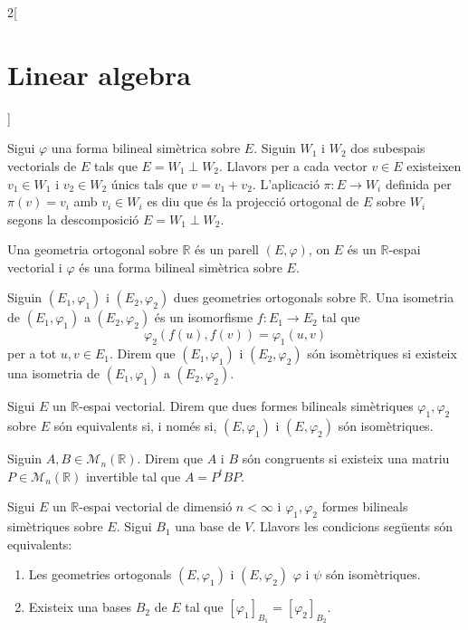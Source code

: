\documentclass[../../../main.tex]{subfiles}
\begin{document}
\begin{multicols}{2}[\section{Linear algebra}]
\begin{definition}
\end{definition}
\begin{definition}
Sigui $\varphi$ una forma bilineal simètrica sobre $E$. Siguin $W_1$ i $W_2$ dos subespais vectorials de $E$ tals que $E=W_1\perp W_2$. Llavors per a cada vector $v\in E$ existeixen $v_1\in W_1$ i $v_2\in W_2$ únics tals que $v=v_1+v_2$. L'aplicació $\pi:E\rightarrow W_i$ definida per $\pi(v)=v_i$ amb $v_i\in W_i$ es diu que és la projecció ortogonal de $E$ sobre $W_i$ segons la descomposició $E=W_1\perp W_2$.
\label{perpendicular}
\end{definition}
\begin{definition}
Una geometria ortogonal sobre $\mathbb{R}$ és un parell $(E,\varphi)$, on $E$ és un $\mathbb{R}$-espai vectorial i $\varphi$ és una forma bilineal simètrica sobre $E$.
\end{definition}
\begin{definition}
Siguin $(E_1,\varphi_1)$ i $(E_2,\varphi_2)$ dues geometries ortogonals sobre $\mathbb{R}$. Una isometria de $(E_1,\varphi_1)$ a $(E_2,\varphi_2)$ és un isomorfisme $f:E_1\rightarrow E_2$ tal que $$\varphi_2(f(u),f(v))=\varphi_1(u,v)$$ per a tot $u,v\in E_1$. Direm que $(E_1,\varphi_1)$ i $(E_2,\varphi_2)$ són isomètriques si existeix una isometria de $(E_1,\varphi_1)$ a $(E_2,\varphi_2)$.
\label{isometry}
\end{definition}
\begin{definition}
Sigui $E$ un $\mathbb{R}$-espai vectorial. Direm que dues formes bilineals simètriques $\varphi_1,\varphi_2$ sobre $E$ són equivalents si, i només si, $(E,\varphi_1)$ i $(E,\varphi_2)$ són isomètriques.
\end{definition}
\begin{definition}
Siguin $A,B\in\mathcal{M}_n(\mathbb{R})$. Direm que $A$ i $B$ són congruents si existeix una matriu $P\in\mathcal{M}_n(\mathbb{R})$ invertible tal que $A=P^tBP$.
\end{definition}
\begin{prop}
Sigui $E$ un $\mathbb{R}$-espai vectorial de dimensió $n<\infty$ i $\varphi_1,\varphi_2$ formes bilineals simètriques sobre $E$. Sigui $B_1$ una base de $V$. Llavors les condicions següents són equivalents:
\begin{enumerate}
    \item Les geometries ortogonals $(E,\varphi_1)$ i $(E,\varphi_2)$ $\varphi$ i $\psi$ són isomètriques.
    \item Existeix una bases $B_2$ de $E$ tal que $[\varphi_1]_{B_1}=[\varphi_2]_{B_2}$.

\end{enumerate}
\end{prop}
\end{multicols}
\end{document}
